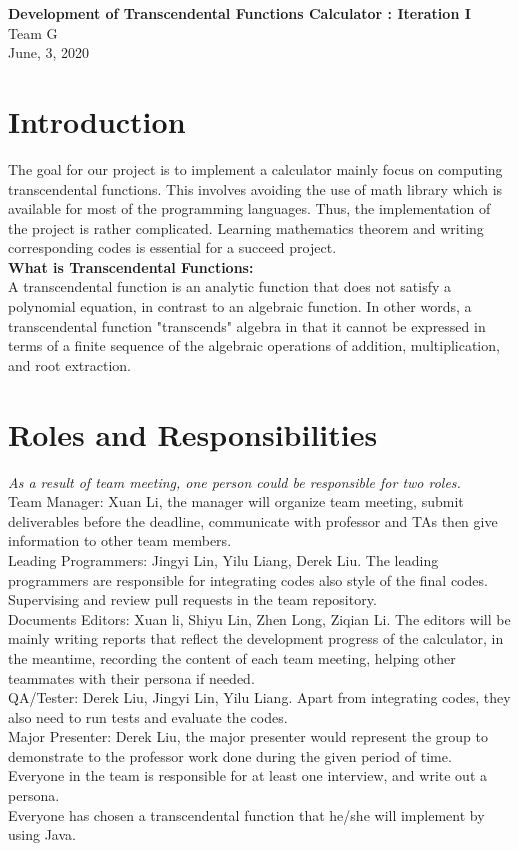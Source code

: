 \documentclass[12pt]{article}
\begin{document}
\begin{titlepage}
	\begin{center}
	\huge{\bfseries Development of Transcendental Functions Calculator : Iteration I}\\
	[1.5cm]
	Team G\\
	[1.5cm]
	June, 3, 2020
	\end{center}
\end{titlepage}
\tableofcontents

\newpage
\section{Introduction}\label{sec:intro}
The goal for our project is to implement a calculator mainly focus on computing transcendental functions. This involves avoiding the use of math library which is available for most of the programming languages. Thus, the implementation of the project is rather complicated. Learning mathematics theorem and writing corresponding codes is essential for a succeed project.\\
[1cm]
\large{\bfseries What is Transcendental Functions:}\\
A transcendental function is an analytic function that does not satisfy a polynomial equation, in contrast to an algebraic function. In other words, a transcendental function "transcends" algebra in that it cannot be expressed in terms of a finite sequence of the algebraic operations of addition, multiplication, and root extraction.\\
\newpage
\section{Roles and Responsibilities}
\textit{As a result of team meeting, one person could be responsible for two roles.}\\
Team Manager: Xuan Li, the manager will organize team meeting, submit deliverables before the deadline, communicate with professor and TAs then give information to other team members.\\
Leading Programmers: Jingyi Lin, Yilu Liang, Derek Liu. The leading programmers are responsible for integrating codes also style of the final codes. Supervising and review pull requests in the team repository.\\
Documents Editors: Xuan li, Shiyu Lin, Zhen Long, Ziqian Li. The editors will be mainly writing reports that reflect the development progress of the calculator, in the meantime, recording the content of each team meeting, helping other teammates with their persona if needed.\\
QA/Tester: Derek Liu, Jingyi Lin, Yilu Liang. Apart from integrating codes, they also need to run tests and evaluate the codes.\\
Major Presenter: Derek Liu, the major presenter would represent the group to demonstrate to the professor work done during the given period of time.\\
Everyone in the team is responsible for at least one interview, and write out a persona.\\
Everyone has chosen a transcendental function that he/she will implement by using Java.\\
\newpage
\end{document}
